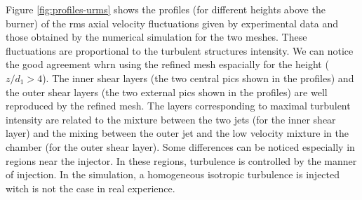 \documentclass[twocolumn,10pt]{asme2e}
\begin{document}
\begin{comment}
\begin{figure}
   \hspace{-11 mm}
   \centering
   \begin{subfigure}[b]{0.38\linewidth}        %
       \centering
       \texttt{[image: fig/urms\_exp.png]}
       \caption{ experimental }
   \end{subfigure}
   \hspace{-3 mm}
   \begin{subfigure}[b]{0.38\linewidth}        %
       \centering
       \texttt{[image: fig/urms\_MESH1.png]}
       \caption{ Mesh1 }
   \end{subfigure}
   \hspace{-3 mm}
   \begin{subfigure}[b]{0.38\linewidth}        %
       \centering
       \texttt{[image: fig/urms\_REF.png]}
       \caption{ Mesh refined }
   \end{subfigure}
   \caption{Comparison of 2D fields of the rms fluctuations of the axial velocity $u_{z,rms}$ above the injector. $z$ is the axial dimension, $x$ the radial dimension and $d_1$ the inner diameter}.
   \label{fig:fields-urms}
   \vspace{-0.05 cm}
\end{figure} 
\end{comment}


Figure \ref{fig:profiles-urms} shows the profiles (for different heights above the burner) of the rms axial velocity fluctuations given by experimental data and those obtained by the numerical simulation for the two meshes. These fluctuations are proportional to the turbulent structures intensity. We can notice the good agreement whrn using the refined mesh espacially for the height ($z/d_1>4$). The inner shear layers (the two central pics shown in the profiles) and the outer shear layers (the two external pics shown in the profiles) are well reproduced by the refined mesh. The layers corresponding to maximal turbulent intensity are related to the mixture between the two jets (for the inner shear layer) and the mixing between the outer jet and the low velocity mixture in the chamber (for the outer shear layer). Some differences can be noticed especially in regions near the injector. In these regions, turbulence is controlled by the manner of injection. In the simulation, a homogeneous isotropic turbulence is injected witch is not the case in real experience.
\end{document}
